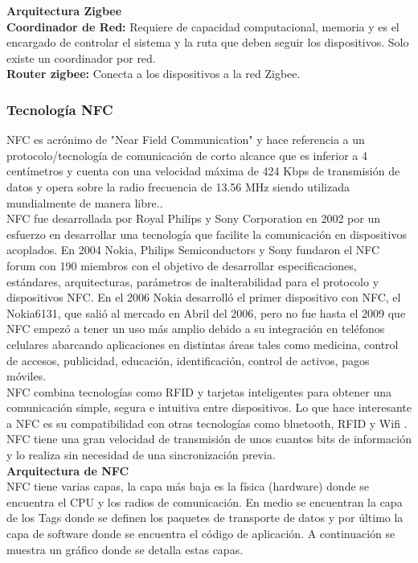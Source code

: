 \documentclass[11pt,openany]{book}
\newcounter{ns}
\begin{document}
	\textbf{Arquitectura Zigbee}\\[0.25cm]
	\textbf{Coordinador de Red: }Requiere de capacidad computacional, memoria y es el encargado de controlar el sistema y la ruta que deben seguir los dispositivos. Solo existe un coordinador por red.\\
	\textbf{Router zigbee: }Conecta a los dispositivos a la red Zigbee.\\

	\subsubsection{Tecnología NFC} 
	NFC es acrónimo de "Near Field Communication" y hace referencia a un protocolo/tecnología de comunicación de corto alcance que es inferior a 4 centímetros y cuenta con una velocidad máxima de 424 Kbps de transmisión de datos y opera sobre la radio frecuencia de 13.56 MHz siendo utilizada mundialmente de manera libre.\cite{Antonio2016,NFCrango,VicenteGarcia2011,Cherrez2010}.\\
	NFC fue desarrollada por Royal Philips y Sony Corporation en 2002 por un esfuerzo en desarrollar una tecnología que facilite la comunicación en dispositivos acoplados\cite{Al-Akkad,Anaya2015,Benyo2009}. En 2004 Nokia, Philips Semiconductors y Sony fundaron el NFC forum con 190 miembros\cite{Al-Akkad} con el objetivo de desarrollar especificaciones, estándares, arquitecturas, parámetros de inalterabilidad para el protocolo y dispositivos NFC\cite{Antonio2016}. En el 2006 Nokia desarrolló el primer dispositivo con NFC, el Nokia6131, que salió al mercado en Abril del 2006\cite{Antonio2016}, pero no fue hasta el 2009 que NFC empezó a tener un uso más amplio debido a su integración en teléfonos celulares abarcando aplicaciones en distintas áreas tales como medicina, control de accesos, publicidad, educación, identificación, control de activos, pagos móviles\cite{Anaya2015}.\\

	NFC combina tecnologías como RFID y tarjetas inteligentes para obtener una comunicación simple, segura e intuitiva entre dispositivos. Lo que hace interesante a NFC es su compatibilidad con otras tecnologías como bluetooth, RFID y Wifi \cite{VicenteGarcia2011}. NFC tiene una gran velocidad de transmisión de unos cuantos bits de información y lo realiza sin necesidad de una sincronización previa.\\
	\newpage
	\textbf{Arquitectura de NFC}\\[0.25cm]
	NFC tiene varias capas, la capa más baja es la física (hardware) donde se encuentra el CPU y los radios de comunicación. En medio se encuentran la capa de los Tags donde se definen los paquetes de transporte de datos y por último la capa de software donde se encuentra el código de aplicación. A continuación se muestra un gráfico donde se detalla estas capas.
\end{document}
